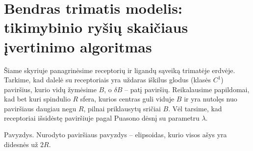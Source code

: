 \documentclass[10pt]{article}
\begin{document}
\begin{figure}[h!]
\end{figure}




\section{Bendras trimatis modelis: tikimybinio ryšių skaičiaus įvertinimo algoritmas}

Šiame skyriuje panagrinėsime receptorių ir ligandų sąveiką trimatėje erdvėje. Tarkime, kad dalelė su receptoriais yra uždaras iškilus  glodus (klasės $ C^1 $) paviršius, kurio vidų žymėsime $ B $, o $ \delta B  $ -- patį paviršių. Reikalausime papildomai, kad bet kuri  spindulio $R$ sfera, kurios centras guli viduje $ B $ ir yra nutolęs nuo  paviršiaus daugiau negu $ R $, pilnai priklausytų sričiai $ B $.  Vėl tarsime, kad receptoriai išsidėstę paviršiuje  pagal Puasono dėsnį su parametru $ \lambda $.

Pavyzdys. Nurodyto paviršiaus pavyzdys -- elipsoidas, kurio visos ašys yra didesnės už $ 2R $.
\end{document}
